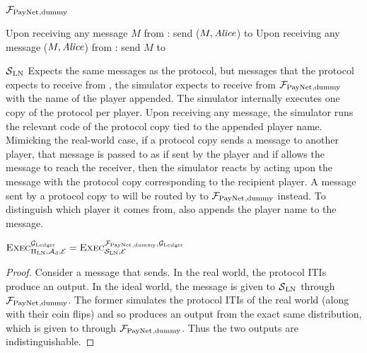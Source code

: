 \begin{systembox}{$\mathcal{F}_{\mathrm{PayNet}}{}_{\mathrm{, dummy}}$}
  \label{alg:fpaynet:dummy}
  \begin{algorithmic}[1]
    \State Upon receiving any message $M$ from \alice: send ($M, \mathit{Alice}$) to
    \simulator
    \State Upon receiving any message ($M, \mathit{Alice}$) from \simulator: send $M$ to
    \alice
  \end{algorithmic}
\end{systembox}

\begin{simulatorbox}{$\mathcal{S}{}_{\mathrm{LN}}$}
  \label{alg:sim:ln}
  Expects the same messages as the protocol, but messages that the protocol
  expects to receive from \environment, the simulator expects to receive from
  $\mathcal{F}_{\mathrm{PayNet}}{}_{\mathrm{, dummy}}$ with the name of the player appended. The
  simulator internally executes one copy of the protocol per player. Upon
  receiving any message, the simulator runs the relevant code of the protocol
  copy tied to the appended player name. Mimicking the real-world case, if a
  protocol copy sends a message to another player, that message is passed to
  \adversary{} as if sent by the player and if \adversary{} allows the message
  to reach the receiver, then the simulator reacts by acting upon the message
  with the protocol copy corresponding to the recipient player. A message sent
  by a protocol copy to \environment{} will be routed by \simulator{} to
  $\mathcal{F}_{\mathrm{PayNet}}{}_{\mathrm{, dummy}}$ instead. To distinguish which player it comes
  from, \simulator{} also appends the player name to the message.
\end{simulatorbox}

\begin{lemma}
  \label{lemma:dummy}
  $\textsc{Exec}^{\mathcal{G}_{\mathrm{Ledger}}}_{\Pi_{\mathrm{LN}}, \mathcal{A}_{\mathrm{d}},
  \mathcal{E}} = \textsc{Exec}^{\mathcal{F}_{\mathrm{PayNet}}{}_{\mathrm{, dummy}},
  \mathcal{G}_{\mathrm{Ledger}}}_{\mathcal{S}_{\mathrm{LN}}, \mathcal{E}}$
\end{lemma}
\begin{proof}
  Consider a message that \environment{} sends. In the real world, the protocol
  ITIs produce an output. In the ideal world, the message is given to
  $\mathcal{S}{}_{\mathrm{LN}}$ through $\mathcal{F}_{\mathrm{PayNet}}{}_{\mathrm{, dummy}}$. The
  former simulates the protocol ITIs of the real world (along with their coin
  flips) and so produces an output from the exact same distribution, which is
  given to \environment{} through $\mathcal{F}_{\mathrm{PayNet}}{}_{\mathrm{, dummy}}$. Thus the two
  outputs are indistinguishable.
\end{proof}
